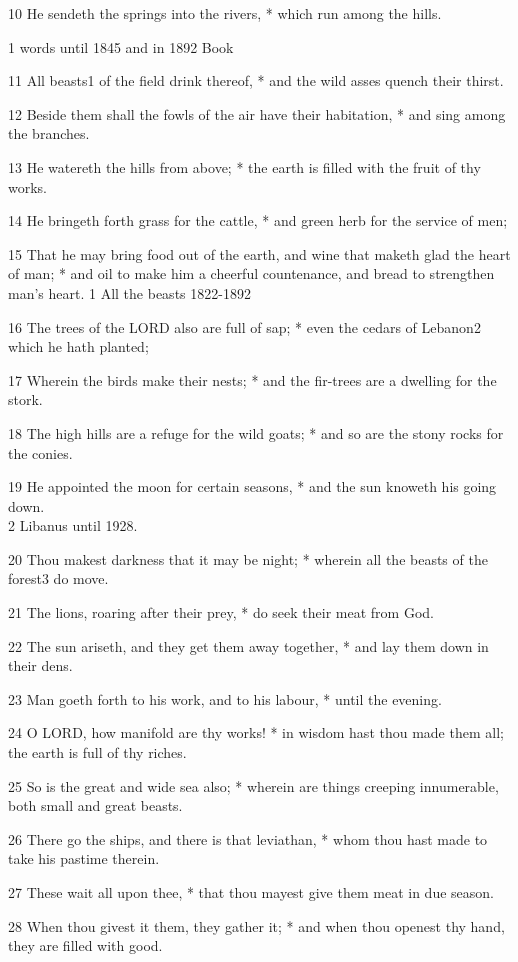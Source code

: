 10 He sendeth the springs into the rivers, * which
run among the hills.

1 words
until
1845 and in 1892 Book

11 All beasts1 of the field drink thereof, * and the wild asses
quench their thirst.

12 Beside them shall the fowls of the air have their
habitation, * and sing among the branches.

13 He watereth the hills from above; * the earth is filled
with the fruit of thy works.

14 He bringeth forth grass for the cattle, * and green
herb for the service of men;

15 That he may bring food out of the earth, and wine
that maketh glad the heart of man; * and oil to make him a cheerful countenance,
and bread to strengthen man's heart. 1
All the beasts 1822-1892

16 The trees of the LORD also are full of sap; * even the cedars of Lebanon2
which he hath planted;

17 Wherein the birds make their nests; * and the fir-trees
are a dwelling for the stork.

18 The high hills are a refuge for the wild goats; *
and so are the stony rocks for the conies.

19 He appointed the moon for certain seasons, * and the
sun knoweth his going down. \\
2 Libanus
until 1928.

20 Thou makest darkness that it may be night; * wherein all the beasts
of the forest3 do move.

21 The lions, roaring after their prey, * do seek their
meat from God.

22 The sun ariseth, and they get them away together,
* and lay them down in their dens.

23 Man goeth forth to his work, and to his labour, *
until the evening.

24 O LORD, how manifold are thy works! * in wisdom hast
thou made them all; the earth is full of thy riches.

25 So is the great and wide sea also; * wherein are things
creeping innumerable, both small and great beasts.

26 There go the ships, and there is that leviathan, *
whom thou hast made to take his pastime therein.

27 These wait all upon thee, * that thou mayest give
them meat in due season.

28 When thou givest it them, they gather it; * and when
thou openest thy hand, they are filled with good.

